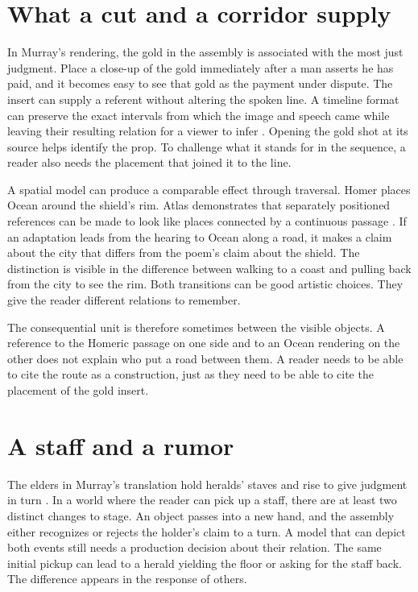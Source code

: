 \documentclass[11pt]{article}
\begin{document}
\section{What a cut and a corridor supply}
In Murray's rendering, the gold in the assembly is associated with the most just judgment. Place a close-up of the gold immediately after a man asserts he has paid, and it becomes easy to see that gold as the payment under dispute. The insert can supply a referent without altering the spoken line. A timeline format can preserve the exact intervals from which the image and speech came while leaving their resulting relation for a viewer to infer \cite{homerIliadMurray,otioWritingAdapter}. Opening the gold shot at its source helps identify the prop. To challenge what it stands for in the sequence, a reader also needs the placement that joined it to the line.

A spatial model can produce a comparable effect through traversal. Homer places Ocean around the shield's rim. Atlas demonstrates that separately positioned references can be made to look like places connected by a continuous passage \cite{homerIliadMurray,worldlabs2026atlas}. If an adaptation leads from the hearing to Ocean along a road, it makes a claim about the city that differs from the poem's claim about the shield. The distinction is visible in the difference between walking to a coast and pulling back from the city to see the rim. Both transitions can be good artistic choices. They give the reader different relations to remember.

The consequential unit is therefore sometimes between the visible objects. A reference to the Homeric passage on one side and to an Ocean rendering on the other does not explain who put a road between them. A reader needs to be able to cite the route as a construction, just as they need to be able to cite the placement of the gold insert.

\section{A staff and a rumor}
The elders in Murray's translation hold heralds' staves and rise to give judgment in turn \cite{homerIliadMurray}. In a world where the reader can pick up a staff, there are at least two distinct changes to stage. An object passes into a new hand, and the assembly either recognizes or rejects the holder's claim to a turn. A model that can depict both events still needs a production decision about their relation. The same initial pickup can lead to a herald yielding the floor or asking for the staff back. The difference appears in the response of others.
\end{document}

